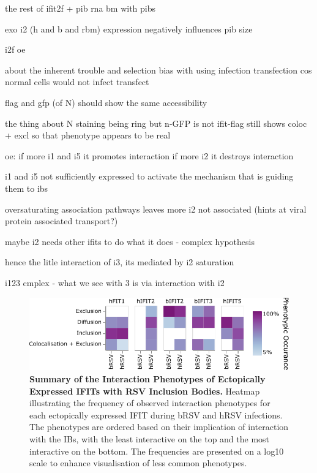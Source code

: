 the rest of ifit2f + pib
rna bm with pibs 

exo i2 (h and b and rbm) expression negatively influences pib size

i2f oe

about the inherent trouble and selection bias with using infection transfection cos normal cells would not infect transfect

flag and gfp (of N) should show the same accessibility

the thing about N staining being ring but n-GFP is not
ifit-flag still shows coloc + excl so that phenotype appears to be real

oe:
if more i1 and i5 it promotes interaction
if more i2 it destroys interaction


i1 and i5 not sufficiently expressed to activate the mechanism that is guiding them to ibs

oversaturating association pathways leaves more i2 not associated (hints at viral protein associated transport?)

maybe i2 needs other ifits to do what it does - complex hypothesis

hence the litle interaction of i3, its mediated by i2 saturation

i123 cmplex - what we see with 3 is via interaction with i2


\begin{figure}
    \centering
    \includegraphics[width=1\linewidth]{09. Chapter 4/Figs/heatmap-infection-transfection.pdf}
    \caption[Summary of the Interaction Phenotypes of Ectopically Expressed IFITs with RSV Inclusion Bodies.]{\textbf{Summary of the Interaction Phenotypes of Ectopically Expressed IFITs with RSV Inclusion Bodies.} Heatmap illustrating the frequency of observed interaction phenotypes for each ectopically expressed IFIT during bRSV and hRSV infections. The phenotypes are ordered based on their implication of interaction with the IBs, with the least interactive on the top and the most interactive on the bottom. The frequencies are presented on a log10 scale to enhance visualisation of less common phenotypes.}
    \label{fig:Summary of the Interaction Phenotypes of Ectopically Expressed IFITs with RSV Inclusion Bodies}
\end{figure}


